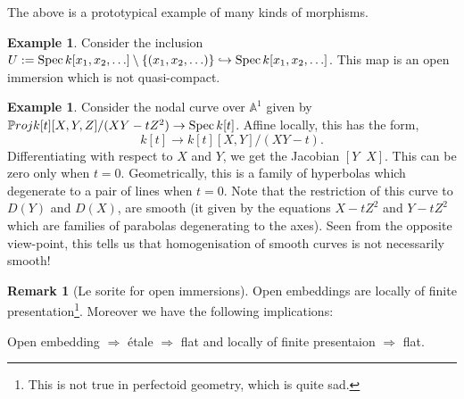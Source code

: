 \documentclass[11pt]{amsart}
\newcommand{\Proj}{{\P roj}}
\newcommand{\Spec}{{\rm Spec \,}}
\newcommand{\A}{{\mathbb A}}
\renewcommand{\P}{{\mathbb P}}
\theoremstyle{definition}
\newtheorem{example}[theorem]{Example}
\newtheorem{remark}[theorem]{Remark}
\begin{document}
The above is a prototypical example of many kinds of morphisms.

\begin{example}
	Consider the inclusion $U:=\Spec k[x_1 ,x_2 ,\ldots] \setminus\lbrace (x_1 ,x_2 ,\ldots)\rbrace\hookrightarrow \Spec k[x_1 ,x_2 ,\ldots]$. This map is an open immersion which is not quasi-compact.%
\end{example}
	
	
\begin{example}\label{example-family-nodal}
	Consider the nodal curve over $\A^1$ given by $\Proj k[t][X,Y,Z]/(XY-tZ^2)\rightarrow \Spec k[t]$. Affine locally, this has the form,
	\[k[t]\rightarrow k[t][X,Y]/(XY-t).\]
	Differentiating with respect to $X$ and $Y$, we get the Jacobian $[Y\;\; X]$. This can be zero only when $t=0$. Geometrically, this is a family of hyperbolas which degenerate to a pair of lines when $t=0$. Note that the restriction of this curve to $D(Y)$ and $D(X)$, are smooth (it given by the equations $X-tZ^2$ and $Y-tZ^2$ which are families of parabolas degenerating to the axes). Seen from the opposite view-point, this tells us that homogenisation of smooth curves is not necessarily smooth!
\end{example}

\begin{remark}[Le sorite for open immersions]
Open embeddings are locally of finite presentation\footnote{This is not true in perfectoid geometry, which is quite sad.}. Moreover we have the following implications:

Open embedding $\Rightarrow$ \'{e}tale $\Rightarrow$ flat and locally of finite presentaion $\Rightarrow$ flat.
\end{remark}
\end{document}
